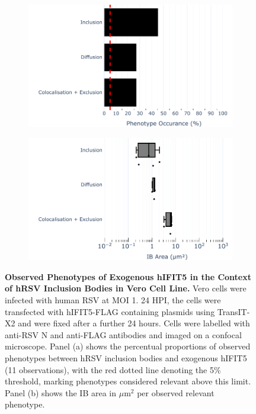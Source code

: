 \begin{figure}
    \begin{subfigure}{0.495\textwidth}
        \caption{}
        \includegraphics[width=1\linewidth]{09. Chapter 4/Figs/02. Overexpression/04. IFIT5/01. bar_i5_hrsv.pdf} 
    \end{subfigure}
    \begin{subfigure}{0.495\textwidth}
        \caption{}
        \includegraphics[width=1\linewidth]{09. Chapter 4/Figs/02. Overexpression/04. IFIT5/02. box_i5_hrsv.pdf}
    \end{subfigure}
    \caption[Observed Phenotypes of Exogenous hIFIT5 in the Context of hRSV Inclusion Bodies in Vero Cell Line.]{\textbf{Observed Phenotypes of Exogenous hIFIT5 in the Context of hRSV Inclusion Bodies in Vero Cell Line.} Vero cells were infected with human RSV at MOI 1. 24 HPI, the cells were transfected with hIFIT5-FLAG containing plasmids using TransIT-X2 and were fixed after a further 24 hours. Cells were labelled with anti-RSV N and anti-FLAG antibodies and imaged on a confocal microscope. Panel (a) shows the percentual proportions of observed phenotypes between hRSV inclusion bodies and exogenous hIFIT5 (11 observations), with the red dotted line denoting the 5\% threshold, marking phenotypes considered relevant above this limit. Panel (b) shows the IB area in \(\mu \mbox{m}^2\) per observed relevant phenotype.}
    \label{fig:Observed Phenotypes of Exogenous hIFIT5 in the Context of hRSV Inclusion Bodies in VERO Cell Line}
\end{figure}

